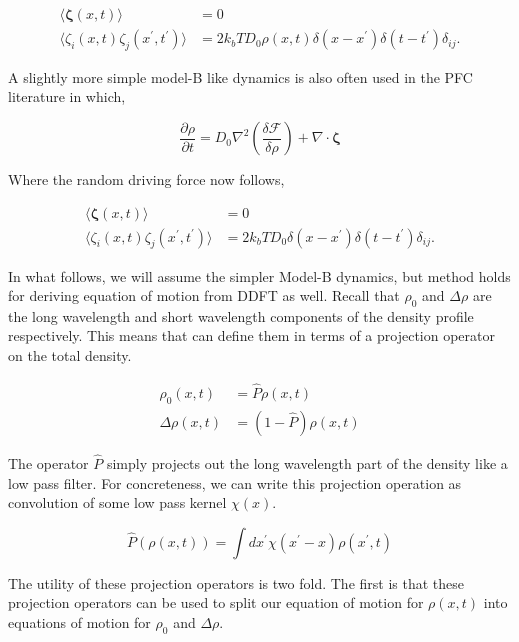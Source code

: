 \documentclass[11pt]{article}
\begin{document}
\begin{align}
\langle \boldsymbol{\zeta}(x, t) \rangle &= 0 \\
\langle \zeta_i(x, t)\zeta_j(x^\prime, t^\prime) \rangle &= 2k_bT D_0 \rho(x, t)\delta(x-x^\prime)\delta(t-t^\prime)\delta_{ij} .
\end{align}

A slightly more simple model-B like dynamics is also often used in the PFC literature in which, 

\begin{equation}
\frac{\partial \rho}{\partial t} = D_0 \nabla^2 \left(\frac{\delta \mathcal{F}}{\delta \rho}\right) + \nabla \cdot \boldsymbol{\zeta}
\end{equation}

Where the random driving force now follows, 

\begin{align}
\langle \boldsymbol{\zeta}(x, t) \rangle &= 0 \\
\langle \zeta_i(x, t)\zeta_j(x^\prime, t^\prime)\rangle &= 2k_bT D_0\delta(x-x^\prime)\delta(t-t^\prime)\delta_{ij}.
\end{align}

In what follows, we will assume the simpler Model-B dynamics, but method holds for deriving equation of motion from DDFT as well. Recall that $\rho_0$ and $\Delta \rho$ are the long wavelength and short wavelength components of the density profile respectively. This means that can define them in terms of a projection operator on the total density. 

\begin{align}
\rho_0(x, t) &= \hat{P}\rho(x, t) \\
\Delta \rho(x,t) &= \left(1-\hat{P}\right)\rho(x, t)
\end{align}

The operator $\hat{P}$ simply projects out the long wavelength part of the density like a low pass filter. For concreteness, we can write this projection operation as convolution of some low pass kernel $\chi(x)$.

\begin{equation}
\hat{P} \left(\rho(x, t)\right) = \int dx^\prime \chi(x^\prime-x)\rho(x^\prime, t)
\end{equation}

The utility of these projection operators is two fold. The first is that these projection operators can be used to split our equation of motion for $\rho(x,t)$ into equations of motion for $\rho_0$ and $\Delta \rho$. 
\end{document}
